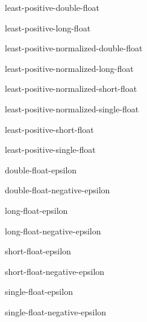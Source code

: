 \begin{constant}{least-positive-double-float}{}{}{}
  
\end{constant}

\begin{constant}{least-positive-long-float}{}{}{}
  
\end{constant}

\begin{constant}{least-positive-normalized-double-float}{}{}{}
  
\end{constant}

\begin{constant}{least-positive-normalized-long-float}{}{}{}
  
\end{constant}

\begin{constant}{least-positive-normalized-short-float}{}{}{}
  
\end{constant}

\begin{constant}{least-positive-normalized-single-float}{}{}{}
  
\end{constant}

\begin{constant}{least-positive-short-float}{}{}{}
  
\end{constant}

\begin{constant}{least-positive-single-float}{}{}{}
  
\end{constant}

\begin{constant}{double-float-epsilon}{}{}{}
  
\end{constant}

\begin{constant}{double-float-negative-epsilon}{}{}{}
  
\end{constant}

\begin{constant}{long-float-epsilon}{}{}{}
  
\end{constant}

\begin{constant}{long-float-negative-epsilon}{}{}{}
  
\end{constant}

\begin{constant}{short-float-epsilon}{}{}{}
  
\end{constant}

\begin{constant}{short-float-negative-epsilon}{}{}{}
  
\end{constant}

\begin{constant}{single-float-epsilon}{}{}{}
  
\end{constant}

\begin{constant}{single-float-negative-epsilon}{}{}{}
  
\end{constant}
